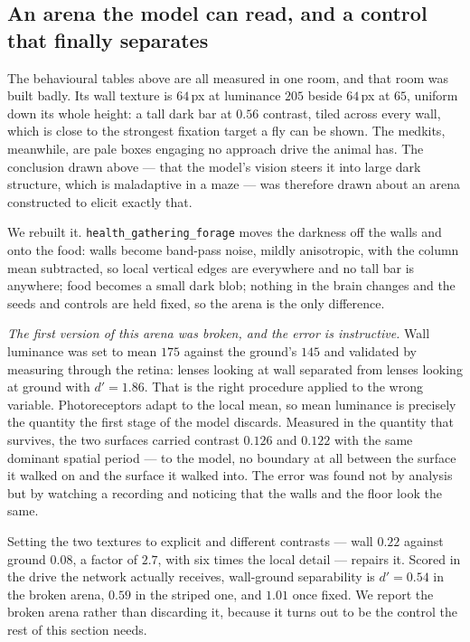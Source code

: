 \documentclass[10pt,twoside]{article}
\begin{document}
\subsection{An arena the model can read, and a control that finally separates}
\label{sec:forage}

The behavioural tables above are all measured in one room, and that room was
built badly. Its wall texture is $64$\,px at luminance $205$ beside $64$\,px at
$65$, uniform down its whole height: a tall dark bar at $0.56$ contrast, tiled
across every wall, which is close to the strongest fixation target a fly can be
shown. The medkits, meanwhile, are pale boxes engaging no approach drive the
animal has. The conclusion drawn above --- that the model's vision steers it
into large dark structure, which is maladaptive in a maze --- was therefore
drawn about an arena constructed to elicit exactly that.

We rebuilt it. \texttt{health\_gathering\_forage} moves the darkness off the
walls and onto the food: walls become band-pass noise, mildly anisotropic, with
the column mean subtracted, so local vertical edges are everywhere and no tall
bar is anywhere; food becomes a small dark blob; nothing in the brain changes
and the seeds and controls are held fixed, so the arena is the only difference.

\emph{The first version of this arena was broken, and the error is instructive.}
Wall luminance was set to mean $175$ against the ground's $145$ and validated by
measuring through the retina: lenses looking at wall separated from lenses
looking at ground with $d'=1.86$. That is the right procedure applied to the
wrong variable. Photoreceptors adapt to the local mean, so mean luminance is
precisely the quantity the first stage of the model discards. Measured in the
quantity that survives, the two surfaces carried contrast $0.126$ and $0.122$
with the same dominant spatial period --- to the model, no boundary at all
between the surface it walked on and the surface it walked into. The error was
found not by analysis but by watching a recording and noticing that the walls
and the floor look the same.

Setting the two textures to explicit and different contrasts --- wall $0.22$
against ground $0.08$, a factor of $2.7$, with six times the local detail ---
repairs it. Scored in the drive the network actually receives, wall-ground
separability is $d'=0.54$ in the broken arena, $0.59$ in the striped one, and
$1.01$ once fixed. We report the broken arena rather than discarding it,
because it turns out to be the control the rest of this section needs.
\end{document}
